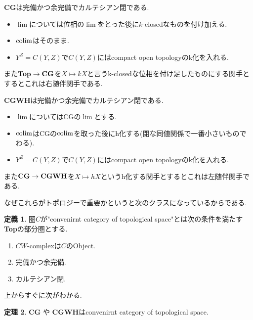 \documentclass[dvipdfmx,a4paper,11pt]{article}
\newcommand{\colim}{{\rm colim}}
\theoremstyle{definition}
\newtheorem{thm}{定理}
\newtheorem{dfn}[thm]{定義}
\begin{document}
\begin{tcolorbox}
 [colback = white, colframe = green!35!black, fonttitle = \bfseries,breakable = true]
 {\bf CG}は完備かつ余完備でカルテシアン閉である.
 \begin{itemize}
 \item $\lim$については位相の$\lim$をとった後に$k$-closedなものを付け加える. 
 \item $\colim$はそのまま. 
 \item $Y^{Z} = C(Y,Z)$で$C(Y,Z)$にはcompact open topologyのk化を入れる. 
 \end{itemize}
 また$ {\bf Top}\to { \bf CG }$を$X \mapsto kX$と言うk-closedな位相を付け足したものにする関手とするとこれは右随伴関手である. 
\end{tcolorbox}

\begin{tcolorbox}
 [colback = white, colframe = green!35!black, fonttitle = \bfseries,breakable = true]
 {\bf CGWH}は完備かつ余完備でカルテシアン閉である.
 \begin{itemize}
 \item $\lim$についてはCGの$\lim$とする. 
 \item $\colim$はCGの$\colim$を取った後にh化する(閉な同値関係で一番小さいものでわる). 
 \item $Y^{Z} = C(Y,Z)$で$C(Y,Z)$にはcompact open topologyのk化を入れる. 
 \end{itemize}
  また$ {\bf CG}\to { \bf CGWH }$を$X \mapsto hX$というh化する関手とするとこれは左随伴関手である. 
\end{tcolorbox}

なぜこれらがトポロジーで重要かというと次のクラスになっているからである.
\begin{tcolorbox}
 [colback = white, colframe = green!35!black, fonttitle = \bfseries,breakable = true]
 \begin{dfn}
圏$C$が"convenirnt category of topological space"とは次の条件を満たす{\bf Top}の部分圏とする.
\begin{enumerate}
\item $CW$-complexは$C$のObject.
\item 完備かつ余完備.
\item カルテシアン閉.
\end{enumerate}
  \end{dfn}
\end{tcolorbox}

上からすぐに次がわかる. 

\begin{tcolorbox}
 [colback = white, colframe = green!35!black, fonttitle = \bfseries,breakable = true]
\begin{thm}
{\bf CG} や {\bf CGWH}はconvenirnt category of topological space.
\end{thm}

\end{tcolorbox}
\end{document}
